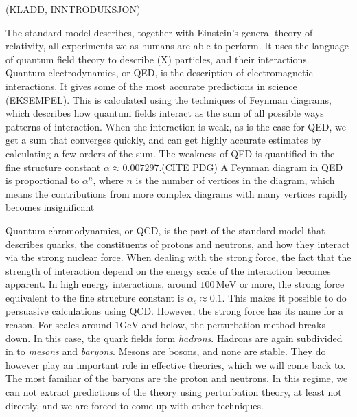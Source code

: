 (KLADD, INNTRODUKSJON)






The standard model describes, together with Einstein's general theory of relativity, all experiments we as humans are able to perform.
It uses the language of quantum field theory to describe (X) particles, and their interactions.
Quantum electrodynamics, or QED, is the description of electromagnetic interactions.
It gives some of the most accurate predictions in science (EKSEMPEL).
This is calculated using the techniques of Feynman diagrams, which describes how quantum fields interact as the sum of all possible ways patterns of interaction.
When the interaction is weak, as is the case for QED, we get a sum that converges quickly, and can get highly accurate estimates by calculating a few orders of the sum.
The weakness of QED is quantified in the fine structure constant $\alpha \approx 0.00 7297$.(CITE PDG)
A Feynman diagram in QED is proportional to $\alpha^n$, where $n$ is the number of vertices in the diagram, which means the contributions from more complex diagrams with many vertices rapidly becomes insignificant


Quantum chromodynamics, or QCD, is the part of the standard model that describes quarks, the constituents of protons and neutrons, and how they interact via the strong nuclear force.
When dealing with the strong force, the fact that the strength of interaction depend on the energy scale of the interaction becomes apparent.
In high energy interactions, around $100\, \text{MeV}$ or more, the strong force equivalent to the fine structure constant is $\alpha_s \approx 0.1$. 
This makes it possible to do persuasive calculations using QCD.
However, the strong force has its name for a reason.
For scales around $1 \text{GeV}$ and below, the perturbation method breaks down.
In this case, the quark fields form \emph{hadrons}.
Hadrons are again subdivided in to \emph{mesons} and \emph{baryons}.
Mesons are bosons, and none are stable. 
They do however play an important role in effective theories, which we will come back to.
The most familiar of the baryons are the proton and neutrons.
In this regime, we can not extract predictions of the theory using perturbation theory, at least not directly, and we are forced to come up with other techniques.

